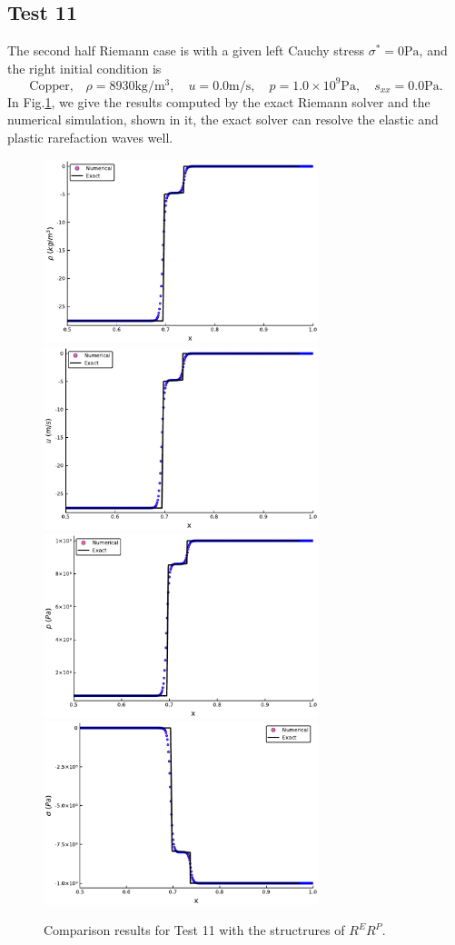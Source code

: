 \documentclass{article}
\numberwithin{equation}{section}
\numberwithin{table}{section}
\begin{document}
\subsection{Test 11}
The second half Riemann case is with  a given left Cauchy stress $\sigma^* = 0 \text{Pa}$, and the right initial condition is
\begin{equation}
  \text{Copper,}\quad\rho = 8930\text{kg}/\text{m}^3, \quad  u = 0.0\text{m}/\text{s}, \quad  p =1.0\times 10^9 \text{Pa}, \quad  s_{xx}=0.0\text{Pa}.
\end{equation}
In Fig.\ref{fig:case10}, we give the results computed by the exact Riemann solver and the numerical simulation, shown in it, the exact solver can resolve the elastic and plastic rarefaction waves well.
\begin{figure}
  \centering
 \includegraphics[width= 8cm] {case11rho.pdf}
  \includegraphics[width= 8cm] {case11u.pdf}
  \includegraphics[width= 8cm] {case11p.pdf}
  \includegraphics[width= 8cm] {case11sigma.pdf}
    \caption{Comparison results for Test 11 with the structrures of $R^ER^P$.  }
  \label{fig:case10}
\end{figure}
\end{document}
